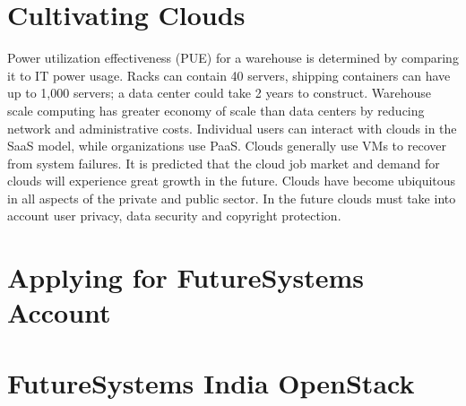 
\section{Cultivating Clouds}

Power utilization effectiveness (PUE) for a warehouse is determined by
comparing it to IT power usage. Racks can contain 40 servers, shipping
containers can have up to 1,000 servers; a data center could take 2
years to construct. Warehouse scale computing has greater economy of
scale than data centers by reducing network and administrative costs.
Individual users can interact with clouds in the SaaS model, while
organizations use PaaS. Clouds generally use VMs to recover from system
failures. It is predicted that the cloud job market and demand for
clouds will experience great growth in the future. Clouds have become
ubiquitous in all aspects of the private and public sector. In the
future clouds must take into account user privacy, data security and
copyright protection.


\section{Applying for FutureSystems Account}



\section{FutureSystems India OpenStack}


